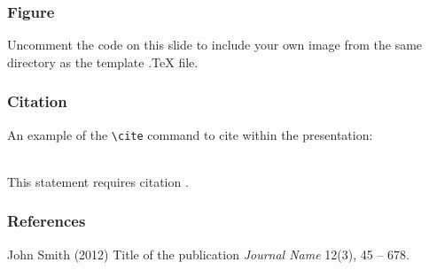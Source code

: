 
\begin{frame}
\frametitle{Figure}
Uncomment the code on this slide to include your own image from the same directory as the template .TeX file.
\end{frame}


\begin{frame}[fragile] %
\frametitle{Citation}
An example of the \verb|\cite| command to cite within the presentation:\\~

This statement requires citation \cite{p1}.
\end{frame}


\begin{frame}
\frametitle{References}
\footnotesize{
\begin{thebibliography}{99} %
 John Smith (2012)
\newblock Title of the publication
\newblock \emph{Journal Name} 12(3), 45 -- 678.
\end{thebibliography}
}
\end{frame}

